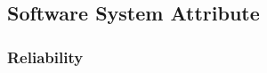 \documentclass[12pt]{article}
\begin{document}
\subsection{Software System Attribute}
\vspace{2mm}
\subsubsection{Reliability}
\end{document}
